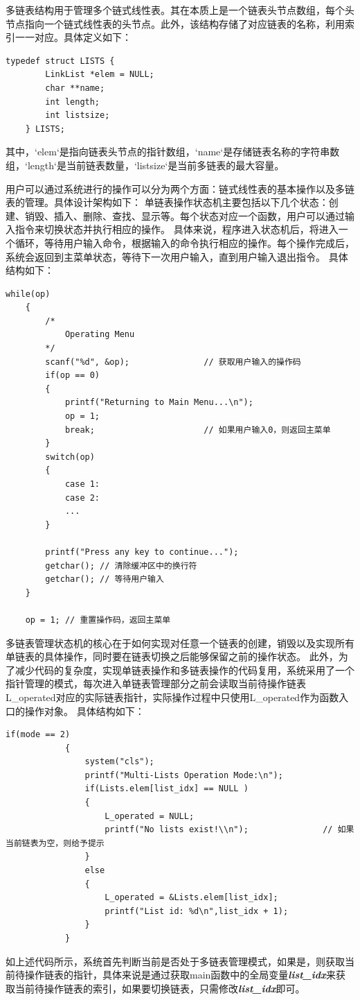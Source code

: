 \documentclass[supercite]{Experimental_Report}
\theoremstyle{definition}
\begin{document}
	多链表结构用于管理多个链式线性表。其在本质上是一个链表头节点数组，每个头节点指向一个链式线性表的头节点。此外，该结构存储了对应链表的名称，利用索引一一对应。具体定义如下：
	\begin{lstlisting}[caption={多链表结构定义}, label=lst:multi_list]
	typedef struct LISTS {
		LinkList *elem = NULL;
		char **name;
		int length;
		int listsize;
	} LISTS; 
	\end{lstlisting}
	其中，`elem`是指向链表头节点的指针数组，`name`是存储链表名称的字符串数组，`length`是当前链表数量，`listsize`是当前多链表的最大容量。

	用户可以通过系统进行的操作可以分为两个方面：链式线性表的基本操作以及多链表的管理。具体设计架构如下：
	单链表操作状态机主要包括以下几个状态：创建、销毁、插入、删除、查找、显示等。每个状态对应一个函数，用户可以通过输入指令来切换状态并执行相应的操作。
	具体来说，程序进入状态机后，将进入一个循环，等待用户输入命令，根据输入的命令执行相应的操作。每个操作完成后，系统会返回到主菜单状态，等待下一次用户输入，直到用户输入退出指令。
	具体结构如下：
	\begin{lstlisting}[caption={单链表操作状态机}, label=lst:state_machine]
	while(op)
	{
		/*
			Operating Menu
		*/
		scanf("%d", &op);				// 获取用户输入的操作码
		if(op == 0)		
		{
			printf("Returning to Main Menu...\n");
			op = 1;
			break;					    // 如果用户输入0，则返回主菜单
		}
		switch(op)
		{
			case 1:
			case 2:
			...
		}

		printf("Press any key to continue...");
		getchar(); // 清除缓冲区中的换行符
		getchar(); // 等待用户输入
	}

	op = 1; // 重置操作码，返回主菜单
	\end{lstlisting}

	多链表管理状态机的核心在于如何实现对任意一个链表的创建，销毁以及实现所有单链表的具体操作，同时要在链表切换之后能够保留之前的操作状态。
	此外，为了减少代码的复杂度，实现单链表操作和多链表操作的代码复用，系统采用了一个指针管理的模式，每次进入单链表管理部分之前会读取当前待操作链表L\_operated对应的实际链表指针，实际操作过程中只使用L\_operated作为函数入口的操作对象。
	具体结构如下：
	\begin{lstlisting}[caption={多链表管理状态机}, label=lst:multi_state_machine]
	if(mode == 2)
            {
                system("cls");   
                printf("Multi-Lists Operation Mode:\n");
                if(Lists.elem[list_idx] == NULL )
                {
                    L_operated = NULL;
                    printf("No lists exist!\\n");			    // 如果当前链表为空，则给予提示
                }
                else
                {
                    L_operated = &Lists.elem[list_idx];
                    printf("List id: %d\n",list_idx + 1);
                }
            }
	\end{lstlisting}
	如上述代码所示，系统首先判断当前是否处于多链表管理模式，如果是，则获取当前待操作链表的指针，具体来说是通过获取main函数中的全局变量\textit{\textbf{list\_idx}}来获取当前待操作链表的索引，如果要切换链表，只需修改\textit{\textbf{list\_idx}}即可。
\end{document}
